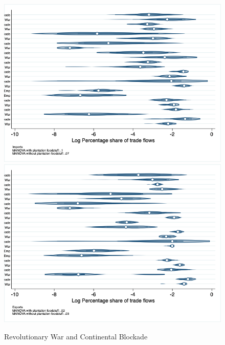 \documentclass[12pt,a4paper,notitlepage,english]{article}
\begin{document}
\begin{figure}
\centering
\caption{Revolutionary War and Continental Blockade}
\label{rev_block_nat_distr}
\includegraphics[scale=.4]{rev_block_nat_distr_Ipays}
\includegraphics[scale=.4]{rev_block_nat_distr_Xpays}
\end{figure}
\end{document}
